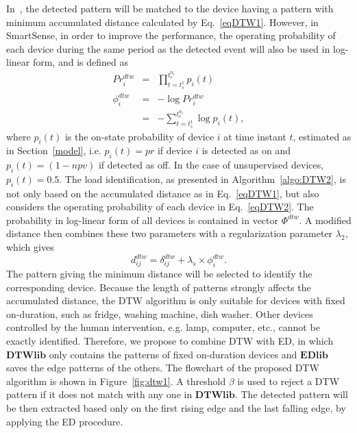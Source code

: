 In~\cite{Liao14}, the detected pattern will be matched to the device having a pattern with minimum accumulated distance calculated by Eq.~\eqref{eqDTW1}. 
However, in SmartSense, in order to improve the performance, the operating probability of each device during the same period as the detected event will also be used in log-linear form, and is defined as
\begin{eqnarray}
Pr_i^{dtw} &=& \prod_{t=t_s^1}^{t_e^{n_e}}{p_i(t)}\\
\phi_i^{dtw} &=& -\log{Pr_i^{dtw}}\nonumber \\
&=& -\sum_{t=t_s^1}^{t_e^{n_e}}{\log{p_i(t)}},\label{eqDTW2}
\end{eqnarray}
where $p_i(t)$ is the on-state probability of device $i$ at time instant $t$, estimated as in Section~\ref{model}, i.e. $p_i(t) =pr$ if device $i$ is detected as on and $p_i(t) = (1-npv)$ if detected as off. In the case of unsupervised devices, $p_i(t) = 0.5$. The load identification, as presented in Algorithm~\ref{algo:DTW2}, is not only based on the accumulated distance as in Eq.~\eqref{eqDTW1}, but also considers the operating probability of each device in Eq.~\eqref{eqDTW2}. The probability in log-linear form of all devices is contained in vector $\Phi^{dtw}$. A modified distance then combines these two parameters with a regularization parameter $\lambda_2$, which gives
\begin{equation}
d_{ij}^{dtw} = \delta_{ij}^{dtw} + \lambda_s\times \phi_i^{dtw}.
\end{equation}
The pattern giving the minimum distance will be selected to identify the corresponding device. Because the length of patterns strongly affects the accumulated distance, the DTW algorithm is only suitable for devices with fixed on-duration, such as fridge, washing machine, dish washer. Other devices controlled by the human intervention, e.g. lamp, computer, etc., cannot be exactly identified. Therefore, we propose to combine DTW with ED, in which $\mathbf{DTWlib}$ only contains the patterns of fixed on-duration devices and $\mathbf{EDlib}$ saves the edge patterns of the others. The flowchart of the proposed DTW algorithm is shown in Figure~\ref{fig:dtw1}. A threshold $\beta$ is used to reject a DTW pattern if it does not match with any one in $\mathbf{DTWlib}$. The detected pattern will be then extracted based only on the first rising edge and the last falling edge, by applying the ED procedure.
